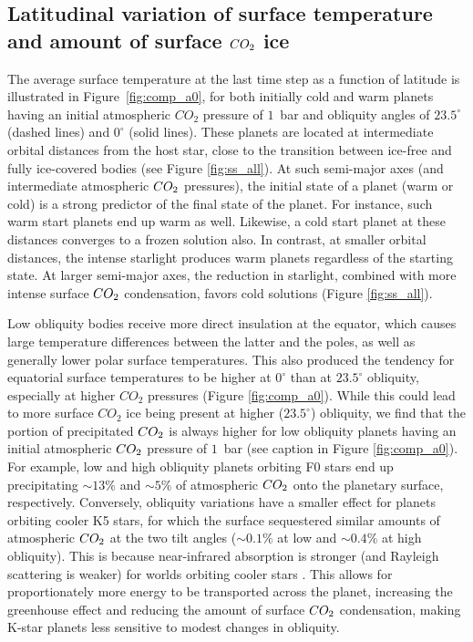 \documentclass[fleqn,usenatbib]{mnras}
\begin{document}
\subsection{Latitudinal variation of surface temperature and amount of surface $CO_{\rm 2}$ ice}
\label{sec:surf_temp}
The  average surface temperature at the last time step as a function of latitude is illustrated in Figure~\ref{fig:comp_a0}, for both initially cold and warm planets having an initial atmospheric $CO_{\mathrm{2}}$ pressure of $1$~bar and obliquity angles of $23.5^{\circ}$ (dashed lines) and $0^{\circ}$ (solid lines). These planets are located at intermediate orbital distances from the host star, close to the transition between ice-free and fully ice-covered bodies (see Figure \ref{fig:ss_all}). At such semi-major axes (and intermediate atmospheric $CO_{\rm 2}$ pressures), the initial state of a planet (warm or cold) is a strong predictor of  the final state of the planet. For instance, such warm start planets end up warm as well. Likewise, a cold start planet at these distances converges to a frozen solution also. In contrast, at smaller  orbital distances, the intense starlight produces warm planets regardless of the starting state. At larger semi-major axes, the reduction in starlight, combined with more intense surface $CO_{\rm 2}$ condensation, favors cold solutions (Figure \ref{fig:ss_all}). 

Low obliquity bodies receive more direct insulation at the equator, which causes large temperature differences between the latter and the poles, as well as generally lower polar surface temperatures. This also produced the tendency for equatorial surface temperatures to be higher at $0^{\circ}$ than at $23.5^{\circ}$ obliquity, especially at higher $CO_{\mathrm{2}}$ pressures (Figure \ref{fig:comp_a0}). While this could lead to more surface $CO_{\mathrm{2}}$ ice being present at higher ($23.5^{\circ}$) obliquity, we find that the portion of precipitated $CO_{\rm 2}$ is always higher for low obliquity planets having an initial atmospheric $CO_{\rm 2}$ pressure of $1$~bar (see caption in Figure \ref{fig:comp_a0}). For example, low and high obliquity planets orbiting F0 stars end up precipitating $\sim 13 \%$ and $\sim 5\%$ of atmospheric $CO_{\rm 2}$ onto the planetary surface, respectively. Conversely, obliquity variations have a smaller effect for planets orbiting cooler K5 stars, for which the surface sequestered similar amounts of atmospheric $CO_{\rm 2}$ at the two tilt angles ($\sim 0.1 \%$ at low and $\sim 0.4\%$ at high obliquity). This is because near-infrared absorption is stronger (and Rayleigh scattering is weaker) for worlds orbiting cooler stars \citep{kasting1993}. This allows for proportionately more energy to be transported across the planet, increasing the greenhouse effect and reducing the amount of surface $CO_{\rm 2}$ condensation, making K-star planets less sensitive to modest changes in obliquity.
\end{document}
